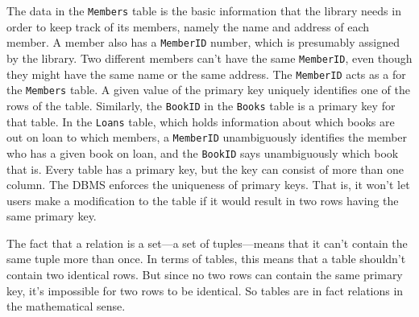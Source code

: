 The data in the \texttt{Members} table is the basic information that
the library needs in order to keep track of its members, namely the name and
address of each member.  A member also has a \texttt{MemberID} number,
which is presumably assigned by the library.  Two different members
can't have the same \texttt{MemberID}, even though they might
have the same name or the same address.  The \texttt{MemberID}
acts as a  for the \texttt{Members} table.
A given value of the primary key uniquely identifies one of
the rows of the table.  Similarly, the \texttt{BookID} in
the \texttt{Books} table is a primary key for that table.
In the \texttt{Loans} table, which holds information about which
books are out on loan to which members, a \texttt{MemberID} 
unambiguously identifies the member who has a given book on loan,
and the \texttt{BookID} says unambiguously which book that is.
Every table has a primary key, but the key can consist of more
than one column.  The DBMS enforces the uniqueness
of primary keys.  That is, it won't let users make a modification
to the table if it would result in two rows having the same
primary key.

The fact that a relation is a set---a set of tuples---means that
it can't contain the same tuple more than once.  In terms of tables, 
this means that a table shouldn't contain two identical rows.  But
since no two rows can contain the same primary key, it's
impossible for two rows to be identical.  So tables are in fact
relations in the mathematical sense.

\medbreak

